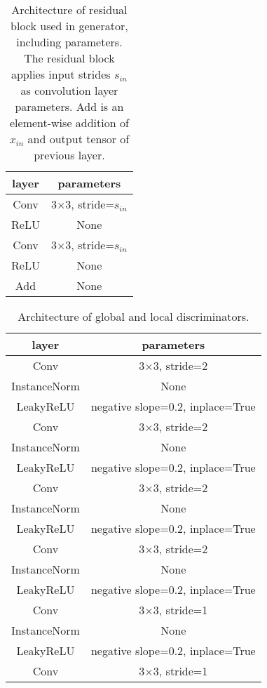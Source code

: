 \documentclass{article}
\begin{document}
\begin{table}[h] 
  \centering  
    \begin{tabular}{c|c}  
    \hline
    \textbf{layer} & \textbf{parameters}\\ 
    \hline
      Conv & 3$\times$3, stride=\(s_{in}\) \\
    \hline
      ReLU & None \\
    \hline
      Conv & 3$\times$3, stride=\(s_{in}\) \\
    \hline
      ReLU & None \\
    \hline
      Add & None \\
    \hline
    \end{tabular}
  
  \caption{Architecture of residual block used in generator, including parameters. The residual block applies input strides \(s_{in}\) as convolution layer parameters. Add is an element-wise addition of \(x_{in}\) and output tensor of previous layer.} 
  \label{tab:2}
  \label{table2} 
\end{table}

\begin{table}[h] 
  \centering  
    \begin{tabular}{c|c}  
    \hline
    \textbf{layer} & \textbf{parameters}\\ 
    \hline
      Conv & 3$\times$3, stride=2 \\
    \hline
      InstanceNorm & None \\
    \hline
      LeakyReLU & negative slope=0.2, inplace=True \\
    \hline
      Conv & 3$\times$3, stride=2 \\
    \hline
      InstanceNorm & None \\
    \hline
      LeakyReLU & negative slope=0.2, inplace=True \\
    \hline
      Conv & 3$\times$3, stride=2 \\
    \hline
      InstanceNorm & None \\
    \hline
      LeakyReLU & negative slope=0.2, inplace=True \\
    \hline
      Conv & 3$\times$3, stride=2 \\
    \hline
      InstanceNorm & None \\
    \hline
      LeakyReLU & negative slope=0.2, inplace=True \\
    \hline
      Conv & 3$\times$3, stride=1 \\
    \hline
      InstanceNorm & None \\
    \hline
      LeakyReLU & negative slope=0.2, inplace=True \\
    \hline
      Conv & 3$\times$3, stride=1 \\
    \hline
    
    \end{tabular}
  
  \caption{Architecture of global and local discriminators.} 
  \label{tab:3}
  \label{table3} 
\end{table}
\end{document}
